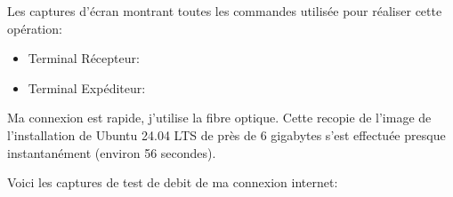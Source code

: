 \documentclass[a4paper,11pt]{article}
\begin{document}
            \bigskip
            \noindent Les captures d'écran montrant toutes les commandes utilisée pour réaliser cette opération:
            \begin{itemize}
                \item Terminal Récepteur:
                    \begin{figure}[ht]
                    \end{figure}
                \item Terminal Expéditeur:
                    \begin{figure}[ht]
                    \end{figure}
            \end{itemize}

            \noindent Ma connexion est rapide, j'utilise la fibre optique. Cette recopie de l'image de l'installation de Ubuntu 24.04 LTS de près de 6 gigabytes s'est effectuée presque instantanément (environ 56 secondes).
            
            \newpage
            \noindent Voici les captures de test de debit de ma connexion internet:
\end{document}
